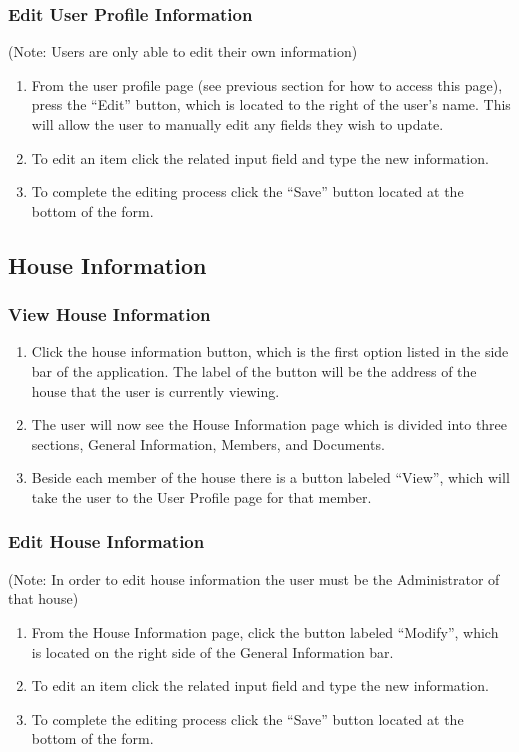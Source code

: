 \documentclass[12pt]{article}
\begin{document}
    \subsubsection{Edit User Profile Information}
    (Note: Users are only able to edit their own information)
    \begin{enumerate}
        \item From the user profile page (see previous section for how to access this page), press the ``Edit'' button, which is located to the right of the user's name. This will allow the user to manually edit any fields they wish to update.
        \item To edit an item click the related input field and type the new information.
        \item To complete the editing process click the ``Save'' button located at the bottom of the form.
    \end{enumerate}
    
    \subsection{House Information} %
    \subsubsection{View House Information}
    \begin{enumerate}
        \item Click the house information button, which is the first option listed in the side bar of the application. The label of the button will be the address of the house that the user is currently viewing.
        \item The user will now see the House Information page which is divided into three sections, General Information, Members, and Documents.
        \item Beside each member of the house there is a button labeled ``View'', which will take the user to the User Profile page for that member.
    \end{enumerate}
    
    \subsubsection{Edit House Information}
    (Note: In order to edit house information the user must be the Administrator of that house)
    \begin{enumerate}
        \item From the House Information page, click the button labeled ``Modify'', which is located on the right side of the General Information bar.
        \item To edit an item click the related input field and type the new information.
        \item To complete the editing process click the ``Save'' button located at the bottom of the form.
    \end{enumerate}
    
\end{document}
